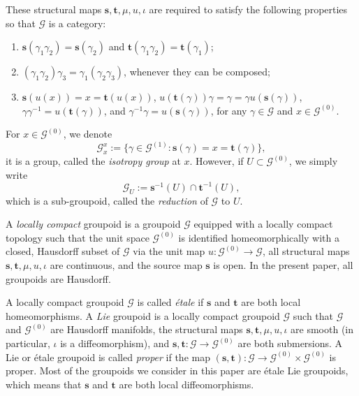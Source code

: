 \documentclass[a4paper]{amsart}
\newcommand{\maG}{\mathcal G}
\newcommand{\bs}{\mathbf{s}}
\newcommand{\bt}{\mathbf{t}}
\newcommand\<{\langle}
\renewcommand\>{\rangle}
\theoremstyle{definition}
\theoremstyle{remark}
\begin{document}

These structural maps $\bs, \bt, \mu, u, \iota$ are required to satisfy the following properties
so that $\maG$ is a category:
\begin{enumerate}
\item
$\bs(\gamma _1 \gamma _2) = \bs(\gamma _2)$ and $\bt(\gamma _1 \gamma _2) = \bt(\gamma _1)$;
\item $(\gamma _1 \gamma _2) \gamma _3 = \gamma_1 (\gamma _2 \gamma _3)$, whenever they can be composed;
\item $\bs (u(x)) = x = \bt(u(x))$, $u(\bt(\gamma)) \gamma = \gamma = \gamma u(\bs(\gamma))$,
$\gamma \gamma ^{-1} = u (\bt(\gamma))$,  and $\gamma^{-1} \gamma = u(\bs(\gamma))$,
for any $\gamma \in \maG$ and $x \in \maG^{(0)}$.
\end{enumerate}
For $x \in \maG ^{(0)}$, we denote
$$ \maG _x^x := \{ \gamma \in \maG ^{(1)} : \bs (\gamma) = x = \bt (\gamma) \}, $$
it is a group, called the {\em isotropy group} at $x$.
However, if $U \subset \maG^{(0)}$, we simply write
$$\maG _U := \bs^{-1}(U) \cap \bt^{-1}(U),$$
which is a sub-groupoid, called the {\em reduction} of $\maG$ to $U$.

A {\em locally compact} groupoid is a groupoid $\maG$ equipped with a locally compact topology
such that the unit space $\maG^{(0)}$ is identified homeomorphically with a closed,
Hausdorff subset of $\maG$ via the unit map $u:\maG^{(0)}\rightarrow \maG$,
all structural maps $\bs, \bt, \mu, u, \iota$ are continuous,
and the source map $\bs$ is open.
In the present paper, all groupoids are Hausdorff.

A locally compact groupoid $\maG$ is called {\em \'etale} if $\bs$ and $\bt$ are both local homeomorphisms.
A {\em Lie} groupoid is a locally compact groupoid $\maG$ such that
$\maG$ and $\maG^{(0)}$ are Hausdorff manifolds,
the structural maps $\bs, \bt, \mu, u, \iota$ are smooth (in particular, $\iota$ is a diffeomorphism),
and $\bs, \bt: \maG \rightarrow \maG^{(0)}$ are both submersions.
A Lie or \'etale groupoid is called {\em proper} if the map $(\bs, \bt) : \maG \rightarrow \maG^{(0)} \times \maG^{(0)}$ is proper.
Most of the groupoids we consider in this paper are \'etale Lie groupoids,
which means that $\bs$ and $\bt$ are both local diffeomorphisms.
\end{document}
